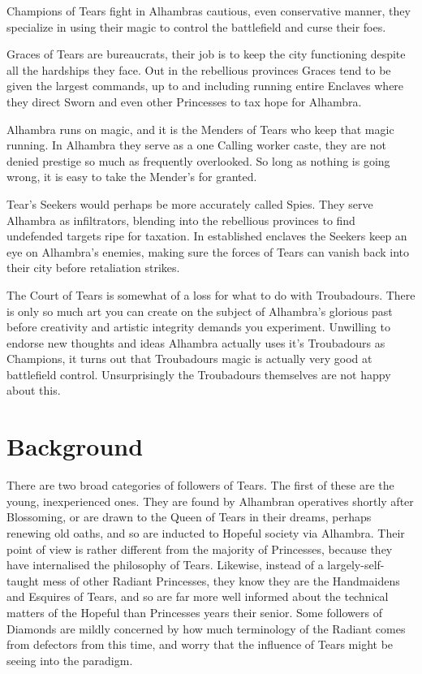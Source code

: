 Champions of Tears fight in Alhambras cautious, even conservative manner, they specialize in using their magic to control the battlefield and curse their foes. 

Graces of Tears are bureaucrats, their job is to keep the city functioning despite all the hardships they face. Out in the rebellious provinces Graces tend to be given the largest commands, up to and including running entire Enclaves where they direct Sworn and even other Princesses to tax hope for Alhambra. 

Alhambra runs on magic, and it is the Menders of Tears who keep that magic running. In Alhambra they serve as a one Calling worker caste, they are not denied prestige so much as frequently overlooked. So long as nothing is going wrong, it is easy to take the Mender's for granted. 

Tear's Seekers would perhaps be more accurately called Spies. They serve Alhambra as infiltrators, blending into the rebellious provinces to find undefended targets ripe for taxation. In established enclaves the Seekers keep an eye on Alhambra's enemies, making sure the forces of Tears can vanish back into their city before retaliation strikes. 

The Court of Tears is somewhat of a loss for what to do with Troubadours. There is only so much art you can create on the subject of Alhambra's glorious past before creativity and artistic integrity demands you experiment. Unwilling to endorse new thoughts and ideas Alhambra actually uses it's Troubadours as Champions, it turns out that Troubadours magic is actually very good at battlefield control. Unsurprisingly the Troubadours themselves are not happy about this. 

\section*{Background}
There are two broad categories of followers of Tears. The first of these are the young, inexperienced ones. They are found by Alhambran operatives shortly after Blossoming, or are drawn to the Queen of Tears in their dreams, perhaps renewing old oaths, and so are inducted to Hopeful society via Alhambra. Their point of view is rather different from the majority of Princesses, because they have internalised the philosophy of Tears. Likewise, instead of a largely-self-taught mess of other Radiant Princesses, they know they are the Handmaidens and Esquires of Tears, and so are far more well informed about the technical matters of the Hopeful than Princesses years their senior. Some followers of Diamonds are mildly concerned by how much terminology of the Radiant comes from defectors from this time, and worry that the influence of Tears might be seeing into the paradigm.

